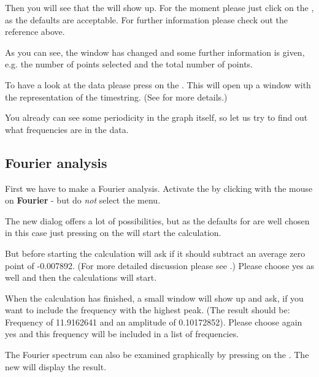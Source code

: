 Then you will see that the  
will show up. For the moment please just click on the ,
as the defaults are acceptable.
For further information please check out the reference above.

As you can see, the window has changed and some further information
is given, e.g. the number of points selected and the total number of
points.

To have a look at the data please press on the .
This will open up a window with the representation of the timestring.
(See  for more details.)

You already can see some periodicity in the graph itself, so 
let us try to find out what frequencies are in the data.

\subsection{Fourier analysis}
First we have to make a Fourier analysis.
Activate the  by clicking
with the mouse on {\bf Fourier} - but do {\it not} select the menu.

The new dialog offers a lot of possibilities, but as the defaults
for \period are well chosen in this case just pressing on the
 will start the calculation.

But before starting the calculation \period will ask if it should
subtract an average zero point of -0.007892. 
(For more detailed discussion please see 
.)
Please choose yes as well and then the calculations will start.

When the calculation has finished, a small window will show up and ask, 
if you want to include the frequency with the highest peak. 
(The result should be: 
Frequency of 11.9162641 
and an amplitude of 0.10172852).
Please choose again yes and this frequency will be included 
in a list of frequencies.

The Fourier spectrum can also be examined graphically by pressing on the
.
The new  will display the result.



